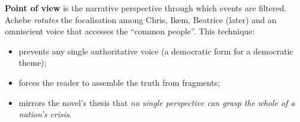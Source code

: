 \documentclass[11pt]{article}
\begin{document}
\begin{definition}
\textbf{Point of view} is the narrative perspective through which events are filtered. Achebe \emph{rotates} the focalisation among Chris, Ikem, Beatrice (later) and an omniscient voice that accesses the “common people”. This technique:
\begin{itemize}
\item prevents any single authoritative voice (a democratic form for a democratic theme);
\item forces the reader to assemble the truth from fragments;
\item mirrors the novel’s thesis that \emph{no single perspective can grasp the whole of a nation’s crisis}.
\end{itemize}
\end{definition}
\end{document}
